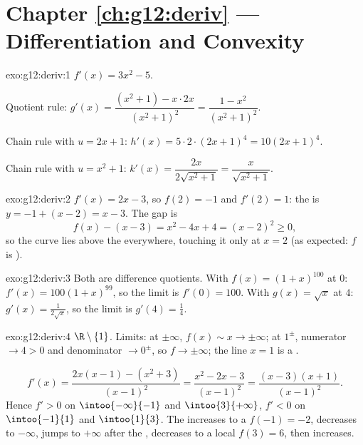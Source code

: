\section*{Chapter \ref{ch:g12:deriv} --- Differentiation and Convexity}

\begin{solution}{exo:g12:deriv:1}
$f'(x) = 3x^2 - 5$.

Quotient rule:
$g'(x) = \dfrac{(x^2+1) - x\cdot 2x}{(x^2+1)^2} = \dfrac{1 - x^2}{(x^2+1)^2}$.

Chain rule with $u = 2x+1$: $h'(x) = 5 \cdot 2 \cdot (2x+1)^4 = 10(2x+1)^4$.

Chain rule with $u = x^2 + 1$:
$k'(x) = \dfrac{2x}{2\sqrt{x^2+1}} = \dfrac{x}{\sqrt{x^2+1}}$.
\end{solution}

\begin{solution}{exo:g12:deriv:2}
$f'(x) = 2x - 3$, so $f(2) = -1$ and $f'(2) = 1$: the  is
$y = -1 + (x - 2) = x - 3$. The gap is
\[
f(x) - (x - 3) = x^2 - 4x + 4 = (x-2)^2 \geq 0 ,
\]
so the curve lies above the  everywhere, touching it only at $x = 2$
(as expected: $f$ is ).
\end{solution}

\begin{solution}{exo:g12:deriv:3}
Both are difference quotients. With $f(x) = (1+x)^{100}$ at $0$:
$f'(x) = 100(1+x)^{99}$, so the limit is $f'(0) = 100$.
With $g(x) = \sqrt{x}$ at $4$: $g'(x) = \frac{1}{2\sqrt{x}}$, so the limit is
$g'(4) = \frac14$.
\end{solution}

\begin{solution}{exo:g12:deriv:4}
 $\R \setminus \{1\}$. Limits: at $\pm\infty$, $f(x) \sim x \to
\pm\infty$; at $1^\pm$, numerator $\to 4 > 0$ and denominator $\to 0^\pm$,
so $f \to \pm\infty$; the line $x = 1$ is a .

\[
f'(x) = \frac{2x(x-1) - (x^2+3)}{(x-1)^2} = \frac{x^2 - 2x - 3}{(x-1)^2}
= \frac{(x-3)(x+1)}{(x-1)^2}.
\]
Hence $f' > 0$ on $\intoo{-\infty}{-1}$ and $\intoo{3}{+\infty}$, $f' < 0$ on
$\intoo{-1}{1}$ and $\intoo{1}{3}$. The  increases to a 
$f(-1) = -2$, decreases to $-\infty$, jumps to $+\infty$ after the ,
decreases to a local  $f(3) = 6$, then increases.
\end{solution}

